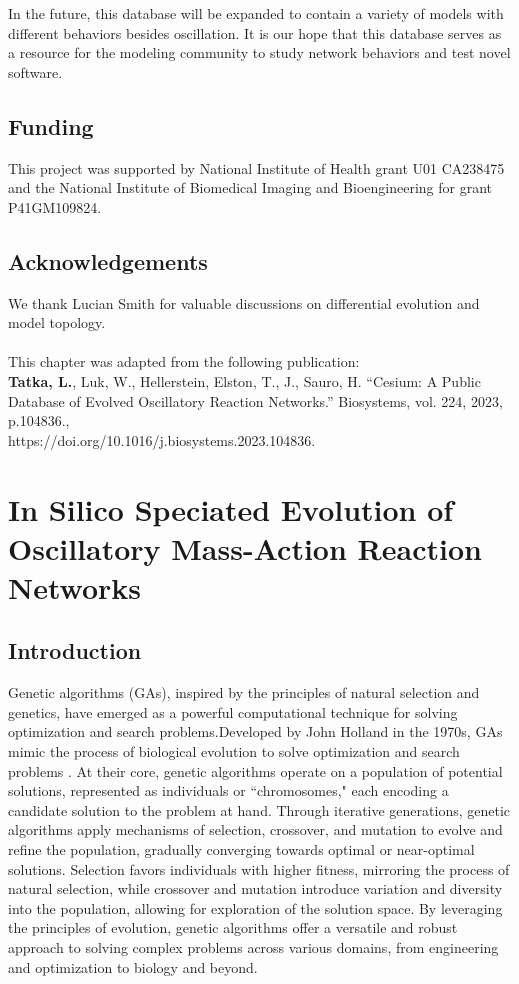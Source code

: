 \documentclass[12pt]{report}
\begin{document}
In the future, this database will be expanded to contain a variety of models with different behaviors besides oscillation. It is our hope that this database serves as a resource for the modeling community to study network behaviors and test novel software.


\section*{Funding}
This project was supported by National Institute of Health grant U01 CA238475 and the National Institute of Biomedical Imaging and Bioengineering for grant P41GM109824.

\section*{Acknowledgements}
We thank Lucian Smith for valuable discussions on differential evolution and model topology. 
\\
\\
This chapter was adapted from the following publication:
\\
\textbf{Tatka, L.}, Luk, W., Hellerstein, Elston, T., J., Sauro, H. “Cesium: A Public Database of Evolved Oscillatory Reaction Networks.”  Biosystems, vol. 224, 2023, p.104836., \\
https://doi.org/10.1016/j.biosystems.2023.104836. 
\\


\chapter{In Silico Speciated Evolution of Oscillatory Mass-Action Reaction Networks}
\label{chap: NetEvolve}
\section{Introduction}
Genetic algorithms (GAs), inspired by the principles of natural selection and genetics, have emerged as a powerful computational technique for solving optimization and search problems.Developed by John Holland in the 1970s, GAs mimic the process of biological evolution to solve optimization and search problems \cite{holland_1975}. At their core, genetic algorithms operate on a population of potential solutions, represented as individuals or ``chromosomes," each encoding a candidate solution to the problem at hand. Through iterative generations, genetic algorithms apply mechanisms of selection, crossover, and mutation to evolve and refine the population, gradually converging towards optimal or near-optimal solutions. Selection favors individuals with higher fitness, mirroring the process of natural selection, while crossover and mutation introduce variation and diversity into the population, allowing for exploration of the solution space. By leveraging the principles of evolution, genetic algorithms offer a versatile and robust approach to solving complex problems across various domains, from engineering and optimization to biology and beyond.
\end{document}
